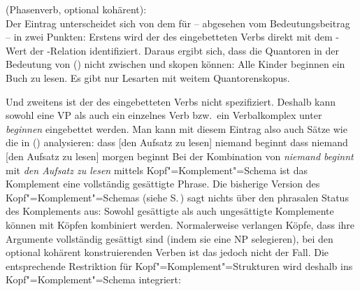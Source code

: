 {
\eas
\label{le-beginnen}%
 (Phasenverb, optional kohärent):\\
\zs
Der Eintrag unterscheidet sich von dem für  -- abgesehen vom Bedeutungsbeitrag -- in
zwei Punkten: Erstens wird der \ltopw des eingebetteten Verbs direkt mit dem \argone-Wert der
\hyp Relation identifiziert. Daraus ergibt sich, dass die Quantoren in der
Bedeutung von () nicht zwischen  und  skopen können:
\ea
Alle Kinder beginnen ein Buch zu lesen.
\z
Es gibt nur Lesarten mit weitem Quantorenskopus.

Und zweitens ist der \lexw des eingebetteten Verbs nicht spezifiziert. Deshalb kann sowohl eine VP als auch ein einzelnes
Verb bzw.\ ein Verbalkomplex unter \emph{beginnen} eingebettet werden. Man kann mit diesem Eintrag also auch Sätze
wie die in () analysieren:
\eal
\ex dass [den Aufsatz zu lesen] niemand beginnt
\ex dass niemand [den Aufsatz zu lesen] morgen beginnt
\zl
Bei der Kombination von \emph{niemand beginnt} mit \emph{den Aufsatz zu lesen} mittels Kopf"=Komplement"=Schema
ist das Komplement eine vollständig gesättigte Phrase. Die bisherige Version des
Kopf"=Komplement"=Schemas (siehe S.\,\pageref{schema-bin}) sagt nichts über den phrasalen Status des Komplements aus: Sowohl gesättigte
als auch ungesättigte Komplemente können mit Köpfen kombiniert werden. Normalerweise verlangen Köpfe,
dass ihre Argumente vollständig gesättigt sind (\zb indem sie eine NP selegieren), bei den optional
kohärent konstruierenden Verben ist das jedoch nicht der Fall. Die entsprechende Restriktion für
Kopf"=Komplement"=Strukturen wird deshalb ins Kopf"=Komplement"=Schema integriert:

}
